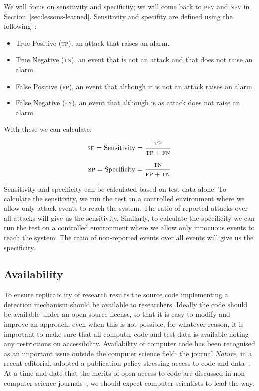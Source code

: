 \documentclass[conference]{IEEEtran}
\begin{document}
We will focus on sensitivity and specificity; we will come back to
\textsc{ppv} and \textsc{npv} in Section~\ref{sec:lessons-learned}.
Sensitivity and specifity are defined using the following~\cite{linn2004}:
\begin{itemize}
\item True Positive (\textsc{tp}), an attack that raises an alarm.
\item True Negative (\textsc{tn}), an event that is not an attack and that does
  not raise an alarm.
\item False Positive (\textsc{fp}), an event that although it is not an attack
  raises an alarm.
\item False Negative (\textsc{fn}), an event that although is as attack does
  not raise an alarm.
\end{itemize}

\noindent
With these we can calculate:

\begin{equation}
  \textsc{se} = \textrm{Sensitivity} = \frac{\textsc{tp}}{\textsc{tp}
    + \textsc{fn}}
\label{eq:sensitivity}
\end{equation}

\begin{equation}
  \textsc{sp} = \textrm{Specificity} = \frac{\textsc{tn}}{\textsc{fp}
    + \textsc{tn}}
\label{eq:specificity}
\end{equation}

\noindent
Sensitivity and specificity can be calculated based on test
data alone. To calculate the sensitivity, we run the test on a
controlled environment where we allow only attack events to reach the
system. The ratio of reported attacks over all attacks will give us
the sensitivity. Similarly, to calculate the specificity we can run
the test on a controlled environment where we allow only innocuous
events to reach the system. The ratio of non-reported events over all
events will give us the specificity. 

\subsection{Availability}

To ensure replicability of research results the source code
implementing a detection mechanism should be available to researchers.
Ideally the code should be available under an open source license, so
that it is easy to modify and improve an approach; even when this is
not possible, for whatever reason, it is important to make sure that
all computer code and test data is available noting any restrictions
on accessibility. Availability of computer code has been recognised as
an important issue outside the computer science field: the journal
\emph{Nature}, in a recent editorial, adopted a publication policy stressing
access to code and data~\cite{nature2014}. At a time and date that the
merits of open access to code are discussed in non computer science
journals~\cite{easterbrook2014}, we should expect computer scientists
to lead the way.
 
\end{document}
